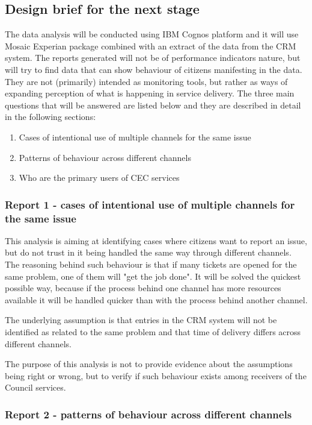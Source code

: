 		\subsection{Design brief for the next stage}
		
The data analysis will be conducted using IBM Cognos platform and it will use Mosaic Experian package combined with an extract of the data from the CRM system. The reports generated will not be of performance indicators nature, but will try to find data that can show behaviour of citizens manifesting in the data. They are not (primarily) intended as monitoring tools, but rather as ways of expanding perception of what is happening in service delivery. The three main questions that will be answered are listed below and they are described in detail in the following sections:
\begin{enumerate}
\item Cases of intentional use of multiple channels for the same issue
\item Patterns of behaviour across different channels
\item Who are the primary users of CEC services
\end{enumerate}
		
			\subsubsection{Report 1 - cases of intentional use of multiple channels for the same issue}
			
This analysis is aiming at identifying cases where citizens want to report an issue, but do not trust in it being handled the same way through different channels. The reasoning behind such behaviour is that if many tickets are opened for the same problem, one of them will "get the job done". It will be solved the quickest possible way, because if the process behind one channel has more resources available it will be handled quicker than with the process behind another channel.

The underlying assumption is that entries in the CRM system will not be identified as related to the same problem and that time of delivery differs across different channels.

The purpose of this analysis is not to provide evidence about the assumptions being right or wrong, but to verify if such behaviour exists among receivers of the Council services.
			
			\subsubsection{Report 2 - patterns of behaviour across different channels}
			

